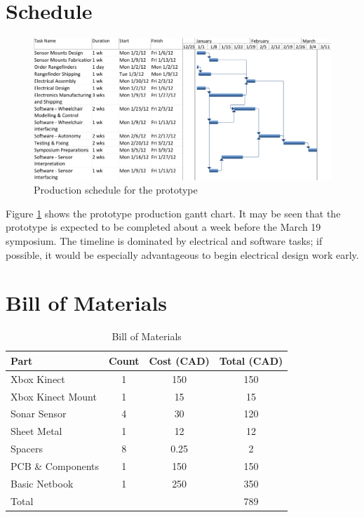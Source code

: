 \documentclass[oneside,final]{report}
\begin{document}
\section{Schedule}
\begin{figure}[htb]
 \centering
 \includegraphics[scale=0.6]{gantt.png}
 \caption{Production schedule for the prototype}
 \label{schedule}
\end{figure}

Figure \ref{schedule} shows the prototype production gantt chart.  It may be seen that the prototype is expected to be completed about a week before the March 19 symposium.  The timeline is dominated by electrical and software tasks; if possible, it would be especially advantageous to begin electrical design work early.

\section{Bill of Materials}
\begin{table}[t]
\centering
\begin{tabular}{|l|c|c|c|}
\hline
Part & Count & Cost (CAD) & Total (CAD) \\
\hline
Xbox Kinect & 1 & 150 & 150 \\
\hline
Xbox Kinect Mount & 1& 15 & 15 \\
Sonar Sensor & 4 & 30 & 120 \\
\hline
Sheet Metal & 1 & 12 & 12 \\
\hline
Spacers & 8 & 0.25 & 2 \\
\hline
PCB \& Components & 1 & 150 & 150 \\
\hline
Basic Netbook & 1 & 250 & 350 \\
\hline
\hline
Total&&&789\\
\hline
\end{tabular}
\caption{Bill of Materials}
\label{tab:BOM}
\end{table}
\end{document}
